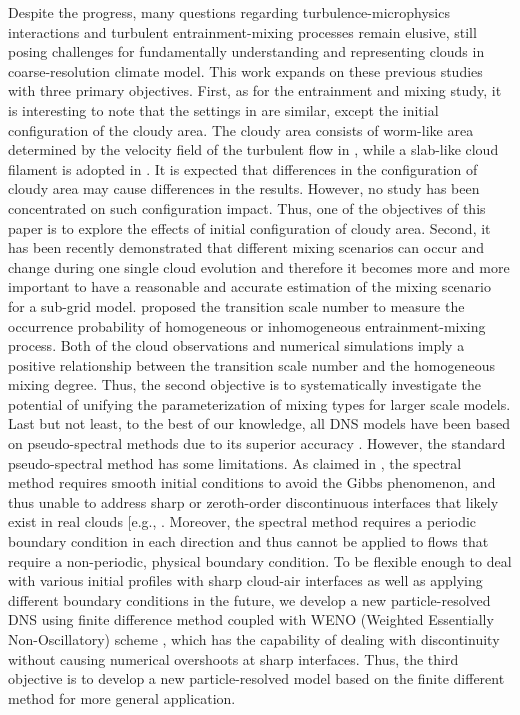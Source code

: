 \documentclass[draft,jgrga]{AGUTeX}
\begin{document}
\begin{article}
Despite the progress, many questions regarding turbulence-microphysics interactions and turbulent entrainment-mixing processes remain elusive, still posing challenges for fundamentally understanding and representing clouds in coarse-resolution climate model. This work expands on these previous studies with three primary objectives. First, as for the entrainment and mixing study, it is interesting to note that the settings in \cite{Kumar12, And04} are similar, except the initial configuration of the cloudy area. The cloudy area consists of worm-like area determined by the velocity field of the turbulent flow in \cite{And04}, while a slab-like cloud filament is adopted in \cite{Kumar12}. It is expected that differences in the configuration of cloudy area may cause differences in the results. However, no study has been concentrated on such configuration impact. Thus, one of the objectives of this paper is to explore the effects of initial configuration of cloudy area. Second, it has been recently demonstrated that different mixing scenarios can occur and change during one single cloud evolution \cite{And09, Burnet1992, Lehmann09} and therefore it becomes more and more important to have a reasonable and accurate estimation of the mixing scenario for a sub-grid model. \cite{Lu2013} proposed the transition scale number to measure the occurrence probability of homogeneous or inhomogeneous entrainment-mixing process. Both of the cloud observations and numerical simulations imply a positive relationship between the transition scale number and the homogeneous mixing degree. Thus, the second objective is to systematically investigate the potential of unifying the parameterization of mixing types for larger scale models. Last but not least, to the best of our knowledge, all DNS models have been based on pseudo-spectral methods due to its superior accuracy \cite{Rogallo81, Orszag72, Celani05, Kumar12}. However, the standard pseudo-spectral method has some limitations. As claimed in \cite{Kumar12}, the spectral method requires smooth initial conditions to avoid the Gibbs phenomenon, and thus unable to address sharp or zeroth-order discontinuous interfaces that likely exist in real clouds [e.g., \cite{Brenguier1993}. Moreover, the spectral method requires a periodic boundary condition in each direction and thus cannot be applied to flows that require a non-periodic, physical boundary condition. To be flexible enough to deal with various initial profiles with sharp cloud-air interfaces as well as applying different boundary conditions in the future, we develop a new particle-resolved DNS using finite difference method coupled with WENO (Weighted Essentially Non-Oscillatory) scheme \cite{JiangShu1996}, which has the capability of dealing with discontinuity without causing numerical overshoots at sharp interfaces. Thus, the third objective is to develop a new particle-resolved model based on the finite different method for more general application.


\end{article}
\end{document}
